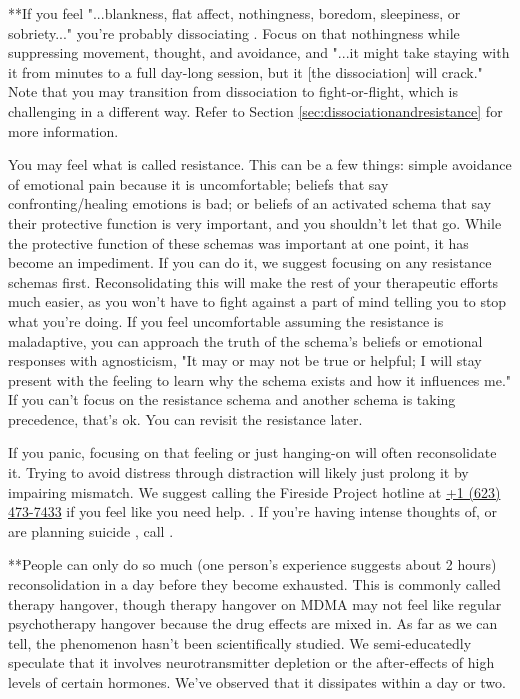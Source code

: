 \documentclass[12pt,letterpaper]{book}
\begin{document}
**If you feel "...blankness, flat affect, nothingness, boredom, sleepiness, or sobriety..." you're probably dissociating \cite{razviPSIP}. Focus on that nothingness while suppressing movement, thought, and avoidance, and "...it might take staying with it from minutes to a full day-long session, but it [the dissociation] will crack." Note that you may transition from dissociation to fight-or-flight, which is challenging in a different way. Refer to Section \ref{sec:dissociationandresistance} for more information.

You may feel what is called resistance. This can be a few things: simple avoidance of emotional pain because it is uncomfortable; beliefs that say confronting/healing emotions is bad; or beliefs of an activated schema that say their protective function is very important, and you shouldn't let that go. While the protective function of these schemas was important at one point, it has become an impediment. If you can do it, we suggest focusing on any resistance schemas first. Reconsolidating this will make the rest of your therapeutic efforts much easier, as you won't have to fight against a part of mind telling you to stop what you're doing. If you feel uncomfortable assuming the resistance is maladaptive, you can approach the truth of the schema's beliefs or emotional responses with agnosticism, "It may or may not be true or helpful; I will stay present with the feeling to learn why the schema exists and how it influences me." If you can't focus on the resistance schema and another schema is taking precedence, that's ok. You can revisit the resistance later.

If you panic, focusing on that feeling or just hanging-on will often reconsolidate it. Trying to avoid distress through distraction will likely just prolong it by impairing mismatch. We suggest calling the Fireside Project hotline at \href{tel:1-623-473-7433}{+1 (623) 473-7433} if you feel like you need help. \cite{firesideProject}. If you're having intense thoughts of, or are planning suicide , call .

\label{def:hangover}
**People can only do so much (one person's experience suggests about 2 hours) reconsolidation in a day before they become exhausted. This is commonly called therapy hangover, though therapy hangover on MDMA may not feel like regular psychotherapy hangover because the drug effects are mixed in. As far as we can tell, the phenomenon hasn't been scientifically studied. We semi-educatedly speculate that it involves neurotransmitter depletion or the after-effects of high levels of certain hormones. We've observed that it dissipates within a day or two.
\end{document}
